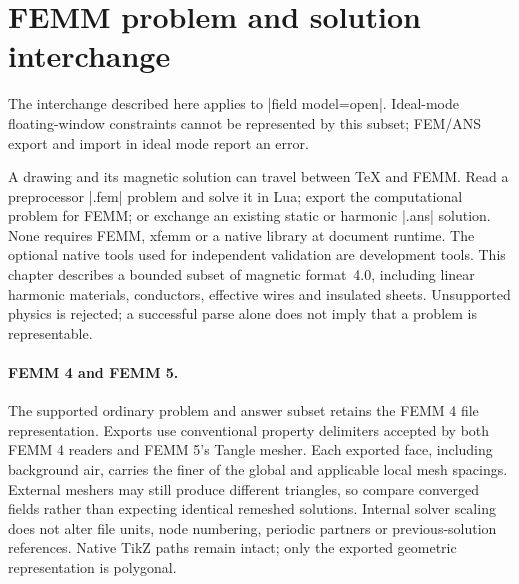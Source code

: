 \section{FEMM problem and solution interchange}
\label{sec:interchange}
The interchange described here applies to |field model=open|. Ideal-mode
floating-window constraints cannot be represented by this subset; FEM/ANS
export and import in ideal mode report an error.

A drawing and its magnetic solution can travel between TeX and FEMM. Read a
preprocessor |.fem| problem and solve it in Lua; export the computational problem
for FEMM; or exchange an existing static or harmonic |.ans| solution. None requires
FEMM, xfemm or a native library at document runtime. The optional native tools
used for independent validation are development tools. This chapter describes a
bounded subset of magnetic format~4.0, including linear harmonic materials,
conductors, effective wires and insulated sheets. Unsupported physics is rejected;
a successful parse alone does not imply that a problem is representable.

\paragraph{FEMM 4 and FEMM 5.}
The supported ordinary problem and answer subset retains the FEMM 4 file
representation. Exports use conventional property delimiters accepted by both
FEMM 4 readers and FEMM 5's Tangle mesher. Each exported face, including
background air, carries the finer of the global and applicable local mesh
spacings. External meshers may still produce different triangles, so compare
converged fields rather than expecting identical remeshed solutions.
Internal solver scaling does not alter file units, node numbering, periodic
partners or previous-solution references. Native TikZ paths remain intact;
only the exported geometric representation is polygonal.

